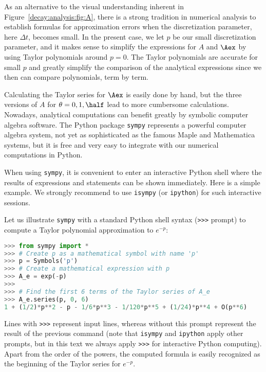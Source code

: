 \documentclass[graybox,sectrefs,envcountresetchap,open=right,final]{svmonodo}
\begin{document}
As an alternative to the visual understanding inherent in Figure~\ref{decay:analysis:fig:A}, there is a strong tradition in numerical
analysis to establish formulas for approximation errors when the
discretization parameter, here $\Delta t$, becomes small. In the
present case, we let $p$ be our small discretization parameter, and it
makes sense to simplify the expressions for $A$ and $\Aex$ by using
Taylor polynomials around $p=0$.  The Taylor polynomials are accurate
for small $p$ and greatly simplify the comparison of the analytical
expressions since we then can compare polynomials, term by term.

Calculating the Taylor series for $\Aex$ is easily done by hand, but
the three versions of $A$ for $\theta=0,1,{\half}$ lead to more
cumbersome calculations.
Nowadays, analytical computations can benefit greatly by
symbolic computer algebra software. The Python package \texttt{sympy}
represents a powerful computer algebra system, not yet as sophisticated as
the famous Maple and Mathematica systems, but it is free and
very easy to integrate with our numerical computations in Python.


When using \texttt{sympy}, it is convenient to enter an interactive Python
shell where the results of expressions and statements can be shown
immediately.
Here is a simple example. We strongly recommend to use
\texttt{isympy} (or \texttt{ipython}) for such interactive sessions.

Let us illustrate \texttt{sympy} with a standard Python shell syntax
(\Verb!>>>! prompt) to compute a Taylor polynomial approximation to $e^{-p}$:











\begin{lstlisting}[language=python,style=blue1_bluegreen]
>>> from sympy import *
>>> # Create p as a mathematical symbol with name 'p'
>>> p = Symbols('p')
>>> # Create a mathematical expression with p
>>> A_e = exp(-p)
>>>
>>> # Find the first 6 terms of the Taylor series of A_e
>>> A_e.series(p, 0, 6)
1 + (1/2)*p**2 - p - 1/6*p**3 - 1/120*p**5 + (1/24)*p**4 + O(p**6)

\end{lstlisting}

Lines with \Verb!>>>! represent input lines, whereas without
this prompt represent the result of the previous command (note that
\texttt{isympy} and \texttt{ipython} apply other prompts, but in this text
we always apply \Verb!>>>! for interactive Python computing).
Apart from the order of the powers, the computed formula is easily
recognized as the beginning of the Taylor series for $e^{-p}$.
\end{document}
